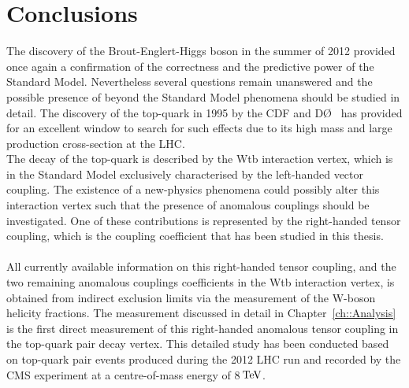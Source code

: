 \chapter{Conclusions}\label{ch::Concl}

The discovery of the Brout-Englert-Higgs boson in the summer of 2012 provided once again a confirmation of the correctness and the predictive power of the Standard Model.
Nevertheless several questions remain unanswered and the possible presence of beyond the Standard Model phenomena should be studied in detail.
The discovery of the top-quark in 1995 by the CDF and D\O~ has provided for an excellent window to search for such effects due to its high mass and large production cross-section at the LHC.
\\
The decay of the top-quark is described by the Wtb interaction vertex, which is in the Standard Model exclusively characterised by the left-handed vector coupling.
The existence of a new-physics phenomena could possibly alter this interaction vertex such that the presence of anomalous couplings should be investigated.
One of these contributions is represented by the right-handed tensor coupling, which is the coupling coefficient that has been studied in this thesis.
\\
\\
All currently available information on this right-handed tensor coupling, and the two remaining anomalous couplings coefficients in the Wtb interaction vertex, is obtained from indirect exclusion limits via the measurement of the W-boson helicity fractions.
The measurement discussed in detail in Chapter~\ref{ch::Analysis} is the first direct measurement of this right-handed anomalous tensor coupling in the top-quark pair decay vertex.
%
This detailed study has been conducted based on top-quark pair events produced during the 2012 LHC run and recorded by the CMS experiment at a centre-of-mass energy of 8$\, \mathrm{TeV}$.
